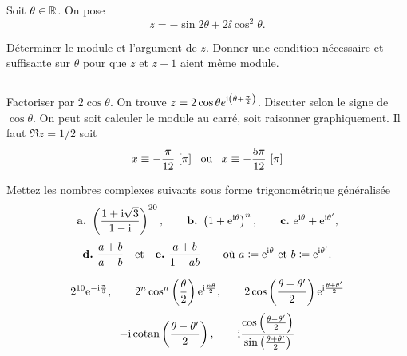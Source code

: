 \documentclass{magnolia}
\begin{document}
Soit $\theta\in\mathbb{R}$. On pose
$$z=-\sin 2\theta+2\ii\cos^2 \theta.$$
\begin{questions}
\question Déterminer le module et l'argument de $z$.
\question Donner une condition nécessaire et suffisante sur $\theta$ pour que
  $z$ et $z-1$ aient même module.
\end{questions}
\begin{sol}
$\quad$
\begin{questions}
\question Factoriser par $2\cos\theta$. On trouve
  $z=2\cos\theta e^{{\rm i}\left(\theta+\frac{\pi}{2}\right)}$. Discuter selon le signe de
  $\cos\theta$.
  \question On peut soit calculer le module au carré, soit raisonner
    graphiquement. Il faut $\Re z=1/2$ soit
    \[x\equiv-\frac{\pi}{12}\ [\pi] \quad\!\text{ou}\quad\! x\equiv -\frac{5\pi}{12}\ [\pi]\]
\end{questions}
\end{sol}

Mettez les nombres complexes suivants sous forme trigonométrique généralisée
$$\textbf{a.}\ \p{\frac{1+\ii\sqrt{3}}{1-\ii}}^{20}, \qquad \textbf{b.}\ \p{1+\e^{\ii\theta}}^n, \qquad
\textbf{c.}\ \e^{\ii\theta}+\e^{\ii\theta'},$$
$$\textbf{d.}\ \frac{a+b}{a-b} \quad \text{et} \quad \textbf{e.}\ \frac{a+b}{1-ab} \qquad
  \text{où $a\coloneqq {\rm e}^{{\rm i}\theta}$ et $b\coloneqq {\rm e}^{{\rm i}\theta'}$}.$$
\begin{sol}
\[2^{10} {\rm e}^{-{\rm i}\frac{\pi}{3}}, \qquad 2^n\cos^n\left(\frac{\theta}{2}\right){\rm e}^{{\rm i}\frac{n\theta}{2}},
  \qquad 2\cos\left(\frac{\theta-\theta'}{2}\right){\rm e}^{{\rm i}\frac{\theta+\theta'}{2}}\]
\[-{\rm i}\operatorname{cotan}\left(\frac{\theta-\theta'}{2}\right), \qquad
  {\rm i}\frac{\cos\left(\frac{\theta-\theta'}{2}\right)}{\sin\left(\frac{\theta+\theta'}{2}\right)}\]
\end{sol}









\end{document}
